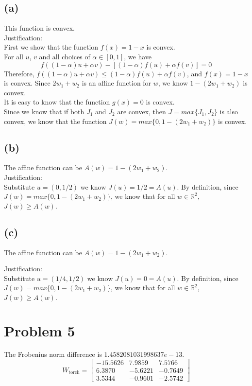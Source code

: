\documentclass[11pt]{article}
\begin{document}
\subsection*{(a)}
This function is convex. \\

Justification: \\
First we show that the function $f(x) = 1-x$ is convex.\\
For all $u$, $v$ and all choices of $\alpha \in [0,1]$, we have 
\begin{equation}
        f((1-\alpha) u + \alpha v) - [(1-\alpha) f(u) + \alpha f(v)] = 0
\end{equation}
Therefore, $f((1-\alpha) u + \alpha v) \leq (1-\alpha) f(u) + \alpha f(v)$, and $f(x)=1-x$ is convex. Since $2w_1+w_2$ is an affine function for $w$, we know $1-(2w_1+w_2)$ is convex. \\
It is easy to know that the function $g(x)=0$ is convex. \\
Since we know that if both $J_1$ and $J_2$ are convex, then $J=max\{J_1, J_2\}$ is also convex, we know that the function $J(w)=max\{0, 1-(2w_1+w_2)\}$ is convex.

\subsection*{(b)}
The affine function can be $A(w)=1-(2w_1+w_2)$. \\

Justification:\\
Substitute $u=(0,1/2)$ we know $J(u)=1/2=A(u)$. By definition, since $J(w)=max\{0, 1-(2w_1+w_2)\}$, we know that for all $w \in \mathbb{R}^2$, $J(w)\geq A(w)$.

\subsection*{(c)}
The affine function can be $A(w)=1-(2w_1+w_2)$.

Justification:\\
Substitute $u=(1/4,1/2)$ we know $J(u)=0=A(u)$. By definition, since $J(w)=max\{0, 1-(2w_1+w_2)\}$, we know that for all $w \in \mathbb{R}^2$, $J(w)\geq A(w)$.

\newpage
\section*{Problem 5}
The Frobenius norm difference is $1.4582081031998637e-13$.
\begin{equation}
    W_{\text{torch}} = \begin{bmatrix}
        -15.5626 & 7.9859 & 7.5766 \\
        6.3870 & -5.6221 & -0.7649 \\
        3.5344 & -0.9601 & -2.5742
    \end{bmatrix}
\end{equation}
\end{document}
